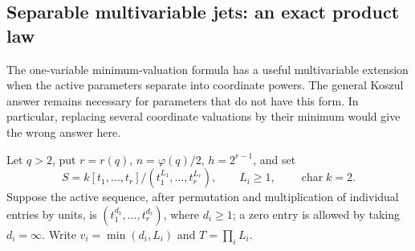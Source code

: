 \subsection{Separable multivariable jets: an exact product law}
\label{irmulti:sec:product}
The one-variable minimum-valuation formula has a useful multivariable
extension when the active parameters separate into coordinate powers.
The general Koszul answer remains necessary for parameters that do not
have this form. In particular, replacing several coordinate valuations
by their minimum would give the wrong answer here.

Let $q>2$, put $r=r(q)$, $n=\varphi(q)/2$, $h=2^{r-1}$, and set
\[
 S=k[t_1,\ldots,t_r]/(t_1^{L_1},\ldots,t_r^{L_r}),\qquad
 L_i\ge1,\qquad \operatorname{char}k=2.
\]
Suppose the active sequence, after permutation and multiplication of
individual entries by units, is $(t_1^{d_1},\ldots,t_r^{d_r})$,
where $d_i\ge1$; a zero entry is allowed by taking $d_i=\infty$.
Write $v_i=\min(d_i,L_i)$ and $T=\prod_iL_i$.

